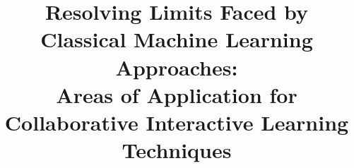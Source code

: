 \documentclass[conference,compsoc]{IEEEtran}
\begin{document}
%
\title{Resolving Limits Faced by Classical Machine Learning Approaches:\\Areas of Application for 
Collaborative Interactive Learning Techniques}


\author{
}


% 



\end{document}
